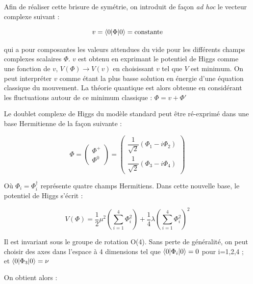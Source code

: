   \medskip
  
  Afin de r\'ealiser cette brisure de sym\'etrie, on introduit de fa\c{c}on \textit{ad hoc} le vecteur complexe suivant : 
  
  \begin{equation}
   v = \braket{0|\Phi|0} = \text{constante}
  \end{equation}

  qui a pour composantes les valeurs attendues du vide pour les diff\'erents champs complexes scalaires $\Phi$. $v$ est obtenu en exprimant le potentiel de Higgs comme une fonction de $v$, $V(\Phi) \rightarrow V(v)$ en choisissant $v$ tel que $V$ est minimum. On peut interpr\'eter $v$ comme \'etant la plus basse solution en \'energie  d'une \'equation classique du mouvement. La th\'eorie quantique est alors obtenue en consid\'erant les fluctuations autour de ce minimum classique : $\Phi = v + \Phi'$
  
  \medskip

  Le doublet complexe de Higgs du mod\`ele standard peut \^etre r\'e-exprim\'e dans une base Hermitienne de la fa\c{c}on suivante : 
  
  \begin{equation}
   \Phi = \begin{pmatrix} \Phi^+ \\ \Phi^0 \end{pmatrix} = \begin{pmatrix} \dfrac{1}{\sqrt{2}} \left(\Phi_1 - i \Phi_2 \right)  \\ \dfrac{1}{\sqrt{2}}(\Phi_3 - i \Phi_4) \end{pmatrix}
  \end{equation}

  O\`u $\Phi_i = \Phi_i^\dagger$ repr\'esente quatre champs Hermitiens. Dans cette nouvelle base, le potentiel de Higgs s'\'ecrit :
  
  \begin{equation}
   V(\Phi) = \dfrac{1}{2} \mu^2 \left( \sum_{i=1}^4 \Phi_i^2 \right) + \dfrac{1}{4} \lambda \left( \sum_{i=1}^4 \Phi_i^2 \right)^2
  \end{equation}

  Il est invariant sous le groupe de rotation O(4). Sans perte de g\'en\'eralit\'e, on peut choisir des axes dans l'espace \`a 4 dimensions tel que $\braket{0|\Phi_i|0} = 0$ pour i=1,2,4 ; et $\braket{0|\Phi_3|0} = \nu$
  
  \medskip
  
  On obtient alors : 

